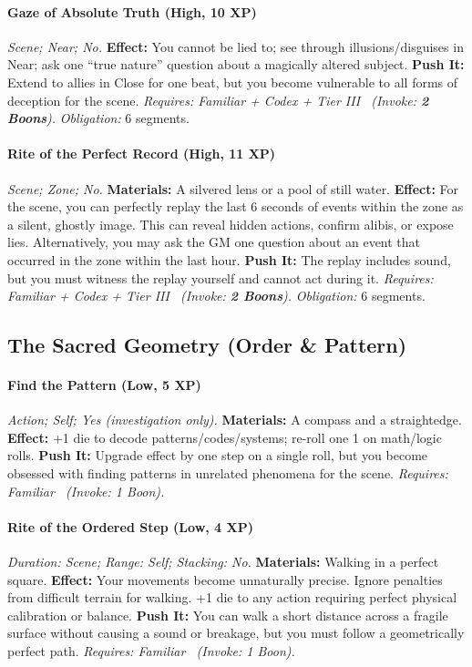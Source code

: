 \paragraph{Gaze of Absolute Truth (High, 10 XP)} \emph{Scene; Near; No.}
\textbf{Effect:} You cannot be lied to; see through illusions/disguises in Near; ask one ``true nature'' question about a magically altered subject.
\textbf{Push It:} Extend to allies in Close for one beat, but you become vulnerable to all forms of deception for the scene.
\emph{Requires: Familiar + Codex + Tier III \ (\textit{Invoke:} \textbf{2 Boons}).}
\emph{Obligation:} 6 segments.

\paragraph{Rite of the Perfect Record (High, 11 XP)} \emph{Scene; Zone; No.}
\textbf{Materials:} A silvered lens or a pool of still water.
\textbf{Effect:} For the scene, you can perfectly replay the last 6 seconds of events within the zone as a silent, ghostly image. This can reveal hidden actions, confirm alibis, or expose lies. Alternatively, you may ask the GM one question about an event that occurred in the zone within the last hour.
\textbf{Push It:} The replay includes sound, but you must witness the replay yourself and cannot act during it.
\emph{Requires: Familiar + Codex + Tier III \ (\textit{Invoke:} \textbf{2 Boons}).}
\emph{Obligation:} 6 segments.

\subsection{The Sacred Geometry (Order \& Pattern)}
\paragraph{Find the Pattern (Low, 5 XP)} \emph{Action; Self; Yes (investigation only).}
\textbf{Materials:} A compass and a straightedge.
\textbf{Effect:} +1 die to decode patterns/codes/systems; re-roll one 1 on math/logic rolls.
\textbf{Push It:} Upgrade effect by one step on a single roll, but you become obsessed with finding patterns in unrelated phenomena for the scene.
\emph{Requires: Familiar \ (\textit{Invoke:} 1 Boon).}
\paragraph{Rite of the Ordered Step (Low, 4 XP)} \emph{Duration: Scene; Range: Self; Stacking: No.}
\textbf{Materials:} Walking in a perfect square.
\textbf{Effect:} Your movements become unnaturally precise. Ignore penalties from difficult terrain for walking. +1 die to any action requiring perfect physical calibration or balance.
\textbf{Push It:} You can walk a short distance across a fragile surface without causing a sound or breakage, but you must follow a geometrically perfect path.
\emph{Requires: Familiar \ (\textit{Invoke:} 1 Boon).}

